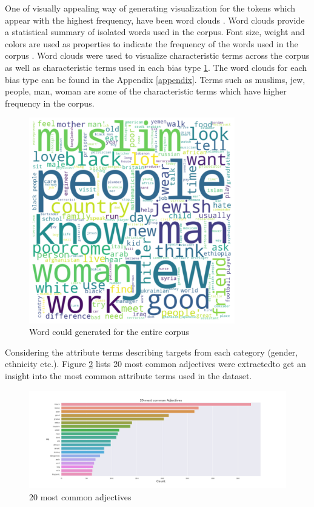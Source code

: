One of visually appealing way of generating visualization for the tokens which appear with the highest frequency, have been word clouds \cite{heimerl2014word}. Word clouds provide a statistical summary of isolated words used in the corpus. Font size, weight and colors are used as properties to indicate the frequency of the words used in the corpus \cite{heimerl2014word}. Word clouds were used to visualize characteristic terms across the corpus as well as characteristic terms used in each bias type \ref{fig:word clouds}. The word clouds for each bias type can be found in the Appendix \ref{appendix}. Terms such as muslims, jew, people, man, woman are some of the characteristic terms which have higher frequency in the corpus.  

\begin{figure}[]
    \centering
    \includegraphics[width=0.8\textwidth]{thesis/figures/Overall.png}
    \caption{Word could generated for the entire corpus}
    \label{fig:word clouds}
\end{figure}
\pagebreak
Considering the attribute terms describing targets from each category (gender, ethnicity etc.).  Figure \ref{fig:Common_adj} lists 20 most common adjectives were extractedto get an insight into the most common attribute terms used in the dataset. 

\begin{figure}[]
    \centering
    \includegraphics[width=1\columnwidth]{thesis/figures/20 most common Adjectives.png}
    \caption{20 most common adjectives}
    \label{fig:Common_adj}
\end{figure}